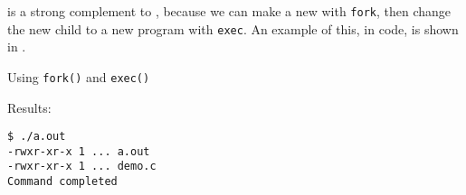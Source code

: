  is a strong complement to , because we can make a new  with \texttt{fork}, then change the new child to a new program with \texttt{exec}.
An example of this, in code, is shown in .

\begin{listing}[h!tbp]
\caption{Using \texttt{fork()} and \texttt{exec()}}
\label{lst:fork_exec}
\end{listing}

Results:
\begin{verbatim}
$ ./a.out
-rwxr-xr-x 1 ... a.out
-rwxr-xr-x 1 ... demo.c
Command completed
\end{verbatim}

